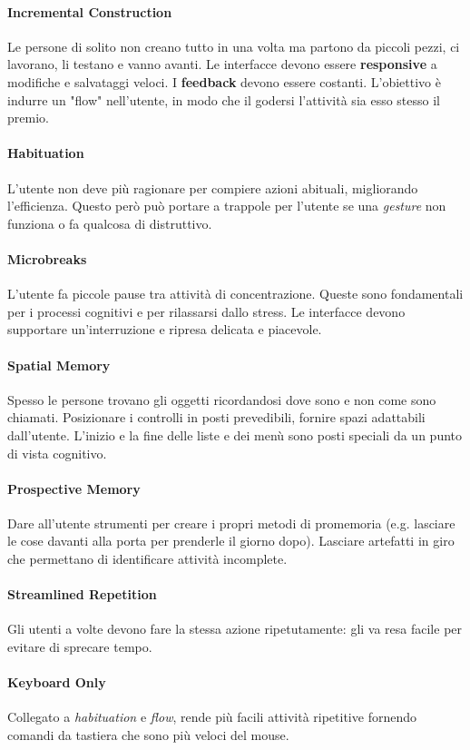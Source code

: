 \paragraph{Incremental Construction} Le persone di solito non creano tutto in una volta ma partono da piccoli pezzi, ci lavorano, li  testano e vanno avanti. Le interfacce devono essere \textbf{responsive} a modifiche e salvataggi veloci. I \textbf{feedback} devono essere costanti. L'obiettivo è indurre un "flow" nell'utente, in modo che il godersi l'attività sia esso stesso il premio.
\paragraph{Habituation} L'utente non deve più ragionare per compiere azioni abituali, migliorando l'efficienza. Questo però può portare a trappole per l'utente se una \textit{gesture} non funziona o fa qualcosa di distruttivo.
\paragraph{Microbreaks} L'utente fa piccole pause tra attività di concentrazione. Queste sono fondamentali per i processi cognitivi e per rilassarsi dallo stress. Le interfacce devono supportare un'interruzione e ripresa delicata e piacevole.
\paragraph{Spatial Memory} Spesso le persone trovano gli oggetti ricordandosi dove sono e non come sono chiamati. Posizionare i controlli in posti prevedibili, fornire spazi adattabili dall'utente. L'inizio e la fine delle liste e dei menù sono posti speciali da un punto di vista cognitivo.
\paragraph{Prospective Memory} Dare all'utente strumenti per creare i propri metodi di promemoria (e.g. lasciare le cose davanti alla porta per prenderle il giorno dopo). Lasciare artefatti in giro che permettano di identificare attività incomplete.
\paragraph{Streamlined Repetition} Gli utenti a volte devono fare la stessa azione ripetutamente: gli va resa facile per evitare di sprecare tempo.
\paragraph{Keyboard Only} Collegato a \textit{habituation} e \textit{flow}, rende più facili attività ripetitive fornendo comandi da tastiera che sono più veloci del mouse.
